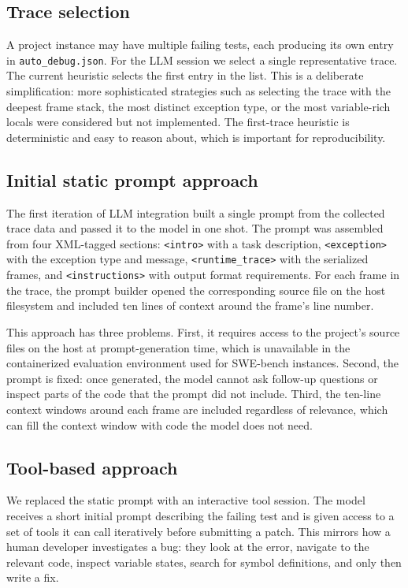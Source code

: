 \subsection{Trace selection}
\label{subsec:trace-selection}

A project instance may have multiple failing tests, each producing its own entry in \texttt{auto\_debug.json}. For the LLM session we select a single representative trace. The current heuristic selects the first entry in the list. This is a deliberate simplification: more sophisticated strategies such as selecting the trace with the deepest frame stack, the most distinct exception type, or the most variable-rich locals were considered but not implemented. The first-trace heuristic is deterministic and easy to reason about, which is important for reproducibility.

\subsection{Initial static prompt approach}
\label{subsec:static-prompt}

The first iteration of LLM integration built a single prompt from the collected trace data and passed it to the model in one shot. The prompt was assembled from four XML-tagged sections: \texttt{<intro>} with a task description, \texttt{<exception>} with the exception type and message, \texttt{<runtime\_trace>} with the serialized frames, and \texttt{<instructions>} with output format requirements. For each frame in the trace, the prompt builder opened the corresponding source file on the host filesystem and included ten lines of context around the frame's line number.

This approach has three problems. First, it requires access to the project's source files on the host at prompt-generation time, which is unavailable in the containerized evaluation environment used for SWE-bench instances. Second, the prompt is fixed: once generated, the model cannot ask follow-up questions or inspect parts of the code that the prompt did not include. Third, the ten-line context windows around each frame are included regardless of relevance, which can fill the context window with code the model does not need.

\subsection{Tool-based approach}
\label{subsec:tool-based}

We replaced the static prompt with an interactive tool session. The model receives a short initial prompt describing the failing test and is given access to a set of tools it can call iteratively before submitting a patch. This mirrors how a human developer investigates a bug: they look at the error, navigate to the relevant code, inspect variable states, search for symbol definitions, and only then write a fix.

